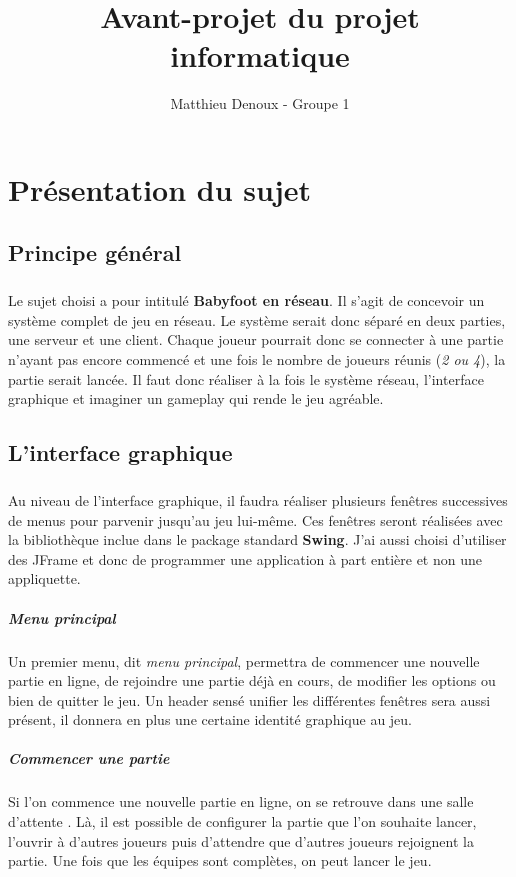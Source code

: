 \documentclass[a4paper,12pt]{report}
\title{Avant-projet du projet informatique}
\author{Matthieu Denoux - Groupe 1}
\begin{document}
\maketitle
\tableofcontents
\chapter{Présentation du sujet}
\section{Principe général}
\paragraph{}
Le sujet choisi a pour intitulé \textbf{Babyfoot en réseau}. Il s'agit de concevoir un système complet de jeu en réseau.
Le système serait donc séparé en deux parties, une serveur et une client. Chaque joueur pourrait donc se connecter à une partie
n'ayant pas encore commencé et une fois le nombre de joueurs réunis (\emph{2 ou 4}), la partie serait lancée. Il faut donc réaliser à la fois 
le système réseau, l'interface graphique et imaginer un gameplay qui rende le jeu agréable.
\section{L'interface graphique}
\paragraph{}
Au niveau de l'interface graphique, il faudra réaliser plusieurs fenêtres successives de menus pour parvenir jusqu'au jeu lui-même. Ces fenêtres seront réalisées avec la bibliothèque inclue dans le package standard \textbf{Swing}. J'ai aussi choisi d'utiliser des JFrame et donc de programmer une application à part entière et non une appliquette.
\paragraph{Menu principal}
Un premier menu, dit \emph{menu principal}, permettra de commencer une nouvelle partie en ligne, de rejoindre une partie
déjà en cours, de modifier les options ou bien de quitter le jeu. Un header sensé unifier les différentes fenêtres sera aussi présent, il donnera en plus une certaine identité graphique au jeu.
\paragraph{Commencer une partie}
Si l'on commence une nouvelle partie en ligne, on se retrouve dans une \og salle d'attente \fg. Là, il est possible de configurer la partie que l'on souhaite lancer, l'ouvrir à d'autres joueurs puis d'attendre que d'autres joueurs rejoignent la partie. Une fois que les équipes sont complètes, on peut lancer le jeu.
\end{document}
